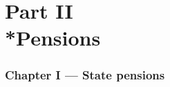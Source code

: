 \documentclass[12pt,a4paper]{article}
\begin{document}
%
%
%
%
%
%
%
%
%
%
%


\part[Part II --- Pensions]{Part II\\*Pensions}

\section[Chapter I --- State pensions]{Chapter I --- State pensions}
\end{document}
